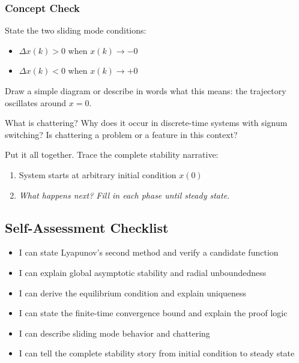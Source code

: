 \subsubsection*{Concept Check}

State the two sliding mode conditions:
\begin{itemize}[nosep]
  \item $\Delta x(k) > 0$ when $x(k) \to -0$
  \item $\Delta x(k) < 0$ when $x(k) \to +0$
\end{itemize}
Draw a simple diagram or describe in words what this means: the trajectory oscillates around $x = 0$.

\begin{largeanswer}\end{largeanswer}

What is chattering? Why does it occur in discrete-time systems with signum switching? Is chattering a problem or a feature in this context?

\begin{answerbox}\end{answerbox}

Put it all together. Trace the complete stability narrative:
\begin{enumerate}[nosep]
  \item System starts at arbitrary initial condition $x(0)$
  \item[\textrm{2--5.}] \emph{What happens next? Fill in each phase until steady state.}
\end{enumerate}

\begin{largeanswer}\end{largeanswer}

\subsection*{Self-Assessment Checklist}

\begin{itemize}[leftmargin=2em, label=$\square$]
  \item I can state Lyapunov's second method and verify a candidate function
  \item I can explain global asymptotic stability and radial unboundedness
  \item I can derive the equilibrium condition and explain uniqueness
  \item I can state the finite-time convergence bound and explain the proof logic
  \item I can describe sliding mode behavior and chattering
  \item I can tell the complete stability story from initial condition to steady state
\end{itemize}

\begin{notesbox}\end{notesbox}

